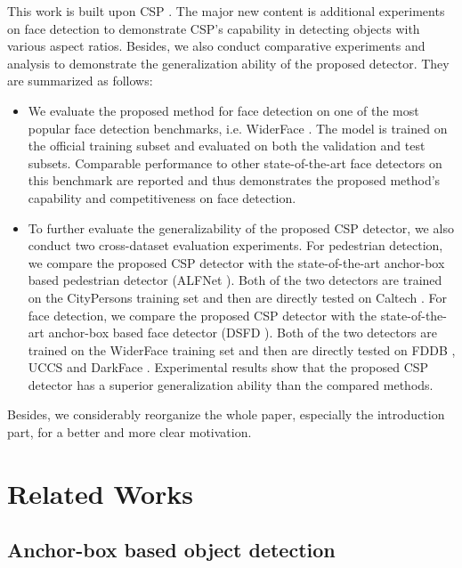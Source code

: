 \documentclass[review]{elsarticle}
\begin{document}
This work is built upon CSP \cite{liu2019high}. The major new content is additional experiments on face detection to demonstrate CSP's capability in detecting objects with various aspect ratios. Besides, we also conduct comparative experiments and analysis to demonstrate the generalization ability of the proposed detector. They are summarized as follows:
\begin{itemize}
\item  We evaluate the proposed method for face detection on one of the most popular face detection benchmarks, i.e. WiderFace \cite{yang2016wider}. The model is trained on the official training subset and evaluated on both the validation and test subsets. Comparable performance to other state-of-the-art face detectors on this benchmark are reported and thus demonstrates the proposed method's capability and competitiveness on face detection.
\item  To further evaluate the generalizability of the proposed CSP detector, we also conduct two cross-dataset evaluation experiments. For pedestrian detection, we compare the proposed CSP detector with the state-of-the-art anchor-box based pedestrian detector (ALFNet \cite{Liu_2018_ECCV}). Both of the two detectors are trained on the CityPersons \cite{zhang2017citypersons} training set and then are directly tested on Caltech \cite{dollar2012pedestrian}.
    For face detection, we compare the proposed CSP detector with the state-of-the-art anchor-box based face detector (DSFD \cite{li2018dsfd}). Both of the two detectors are trained on the WiderFace \cite{yang2016wider} training set and then are directly tested on FDDB \cite{fddbTech}, UCCS \cite{uccs} and DarkFace \cite{wei2018deep}. Experimental results show that the proposed CSP detector has a superior generalization ability than the compared methods.
\end{itemize}

Besides, we considerably reorganize the whole paper, especially the introduction part, for a better and more clear motivation.  


\section{Related Works}
\subsection{Anchor-box based object detection}
\end{document}
